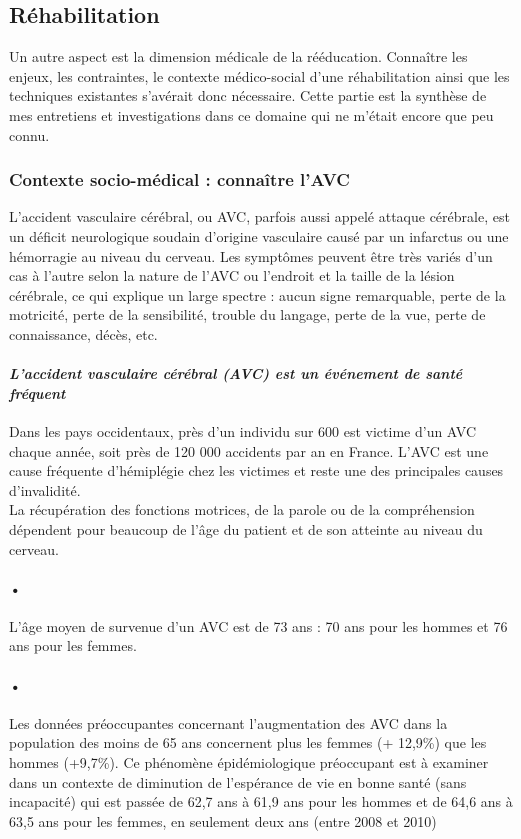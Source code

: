 	\subsection{Réhabilitation}
Un autre aspect est la dimension médicale de la rééducation. Connaître les enjeux, les contraintes, le contexte médico-social d'une réhabilitation ainsi que les techniques existantes s'avérait donc nécessaire. Cette partie est la synthèse de mes entretiens et investigations dans ce domaine qui ne m'était encore que peu connu.

		\subsubsection{Contexte socio-médical : connaître l'AVC}
L'accident vasculaire cérébral, ou AVC, parfois aussi appelé attaque cérébrale, est un déficit neurologique soudain d'origine vasculaire causé par un infarctus ou une hémorragie au niveau du cerveau. Les symptômes peuvent être très variés d'un cas à l'autre selon la nature de l'AVC ou l'endroit et la taille de la lésion cérébrale, ce qui explique un large spectre : aucun signe remarquable, perte de la motricité, perte de la sensibilité, trouble du langage, perte de la vue, perte de connaissance, décès, etc.	

		\paragraph{\emph{L’accident vasculaire cérébral (AVC) est un événement de santé fréquent}\\}
Dans les pays occidentaux, près d'un individu sur 600 est victime d'un AVC chaque année, soit près de 120 000 accidents par an en France. L'AVC est une cause fréquente d'hémiplégie chez les victimes et reste une des principales causes d'invalidité. \\
La récupération des fonctions motrices, de la parole ou de la compréhension dépendent pour beaucoup de l'âge du patient et de son atteinte au niveau du cerveau.

\paragraph{•}L’âge moyen de survenue d’un AVC est de 73 ans : 70 ans pour les hommes et 76 ans pour les femmes.

\paragraph{•}   Les données préoccupantes concernant l’augmentation des AVC dans la population des moins de 65 ans concernent plus les femmes (+ 12,9\%) que les hommes (+9,7\%). Ce phénomène épidémiologique préoccupant est à examiner dans un contexte de diminution de l’espérance de vie en bonne santé (sans incapacité) qui est passée de 62,7 ans à 61,9 ans pour les hommes et de 64,6 ans à 63,5 ans pour les femmes, en seulement deux ans (entre 2008 et 2010)

